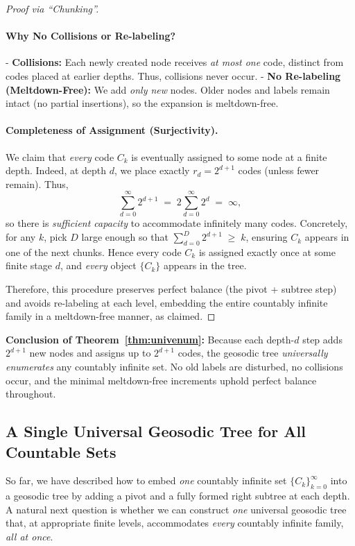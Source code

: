 \documentclass[11pt]{article}
\theoremstyle{definition}
\theoremstyle{remark}
\begin{document}
\begin{proof}[Proof via ``Chunking'']
\paragraph{Why No Collisions or Re-labeling?}
- \textbf{Collisions:} Each newly created node receives \emph{at most one} code, 
  distinct from codes placed at earlier depths. Thus, collisions never occur.
- \textbf{No Re-labeling (Meltdown-Free):} We add \emph{only new} nodes. 
  Older nodes and labels remain intact (no partial insertions), so the expansion is meltdown-free.

\paragraph{Completeness of Assignment (Surjectivity).}
We claim that \emph{every} code $C_k$ is eventually assigned to some node at a finite depth.
Indeed, at depth $d$, we place exactly $r_d = 2^{d+1}$ codes (unless fewer remain). Thus,
\[
  \sum_{d=0}^{\infty} 2^{d+1} 
  \;=\; 
  2 \sum_{d=0}^{\infty} 2^d 
  \;=\; 
  \infty,
\]
so there is \emph{sufficient capacity} to accommodate infinitely many codes. 
Concretely, for any $k$, pick $D$ large enough so that 
$\sum_{d=0}^D 2^{d+1} \;\ge\; k$, ensuring $C_k$ appears in one of the next chunks. 
Hence every code $C_k$ is assigned exactly once at some finite stage $d$, 
and \emph{every} object $\{C_k\}$ appears in the tree.

\smallskip
\noindent
Therefore, this procedure preserves perfect balance (the pivot + subtree step) 
and avoids re-labeling at each level, embedding the entire countably infinite family 
in a meltdown-free manner, as claimed.
\end{proof}

\noindent
\textbf{Conclusion of Theorem~\ref{thm:univenum}:}
Because each depth-$d$ step adds $2^{d+1}$ new nodes and assigns up to $2^{d+1}$ codes,
the geosodic tree \emph{universally enumerates} any countably infinite set. 
No old labels are disturbed, no collisions occur, and the minimal meltdown-free increments 
uphold perfect balance throughout.

 \subsection{A Single Universal Geosodic Tree for All Countable Sets}
\label{sec:single-geosodic}

So far, we have described how to embed \emph{one} countably infinite set 
$\{C_k\}_{k=0}^\infty$ into a geosodic tree by adding a pivot and a fully formed 
right subtree at each depth. A natural next question is whether we can 
construct \emph{one} universal geosodic tree that, at appropriate finite levels, 
accommodates \emph{every} countably infinite family, \emph{all at once}.
\end{document}
